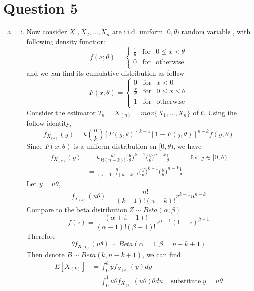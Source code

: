 \documentclass[a4paper,11pt]{article}
\begin{document}
\section*{Question 5}
\begin{enumerate}[a)]
\item
	\begin{enumerate}[i)]
		\item
			Now consider $X_1,X_2,...,X_n$ are i.i.d. uniform $[0,\theta)$ random variable , with following density function:
			\[
				f(x;\theta) = \left\{ 
				\begin{array}{rcl}
				\frac{1}{\theta} & \mbox{for}
				& 0\le x < \theta \\ 0 & \mbox{for} & \mbox{otherwise} \\
				\end{array}\right.
			\]
			and we can find its cumulative distribution as follow
			\[
				F(x;\theta) = \left\{ 
				\begin{array}{rcl}
				0 & \mbox{for} & x<0 \\
				\frac{x}{\theta} & \mbox{for}
				& 0\le x \le \theta \\ 1 & \mbox{for} & \mbox{otherwise} \\
				\end{array}\right.
			\]
		Consider the estimator $T_n=X_{(n)} = max\{X_1,...,X_n\} $ of $\theta$.
		Using the follow identity,
			\[
				f_{X_{(k)}}(y) = k \binom{n}{k}[F(y;\theta)]^{k-1}[1-F(y;\theta)]^{n-k}f(y;\theta)
			\]
		Since $F(x;\theta)$ is a uniform distribution on $[0,\theta)$, we have
			\begin{align*}
				f_{X_{(k)}}(y) &= k \frac{n!}{k!(n-k)!}\bigg(\frac{y}{\theta}\bigg)^{k-1} \bigg( \frac{y}{\theta} \bigg)^{n-k}\frac{1}{\theta}  & \mbox{ for } y\in[0,\theta) \\
				&=   \frac{n!}{(k-1)!(n-k)!}\bigg(\frac{y}{\theta}\bigg)^{k-1} \bigg( \frac{y}{\theta} \bigg)^{n-k}\frac{1}{\theta} 
			\end{align*}
	Let $y= u\theta$,
	\[
		f_{X_{(k)}}(u\theta) =   \frac{n!}{(k-1)!(n-k)!}u^{k-1}  u^{n-k}
	\]
		Compare to the beta distribution $Z \sim Beta(\alpha,\beta)$
			\[
				f(z) = \frac{(\alpha+\beta-1)!}{(\alpha-1)!(\beta-1)!}z^{\alpha -1} (1-z)^{\beta-1}
			\]
	Therefore
		\[
			\theta f_{X_{(k)}}(u\theta)\sim Beta (\alpha = 1 , \beta = n-k+1)
		\]
	Then denote $B\sim Beta (k,n-k+1)$, we can find 
		\begin{align*}
			E[X_{(k)}] &= \int^\theta_0 y f_{X_{(k)}}(y)  dy\\
			&= \int^1_0 u\theta  f_{X_{(k)}}(u\theta )  \theta du & \mbox{ substitute } y = u \theta \\

\end{align*}
\end{enumerate}
\end{enumerate}
\end{document}
